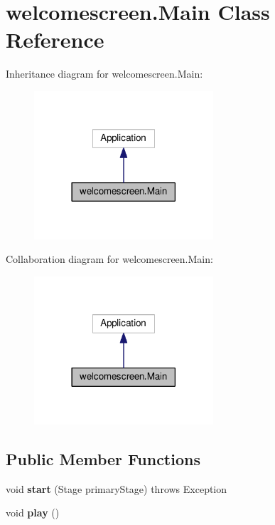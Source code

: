 \hypertarget{classwelcomescreen_1_1_main}{}\section{welcomescreen.\+Main Class Reference}
\label{classwelcomescreen_1_1_main}


Inheritance diagram for welcomescreen.\+Main\+:\nopagebreak
\begin{figure}[H]
\begin{center}
\leavevmode
\includegraphics[width=189pt]{classwelcomescreen_1_1_main__inherit__graph}
\end{center}
\end{figure}


Collaboration diagram for welcomescreen.\+Main\+:\nopagebreak
\begin{figure}[H]
\begin{center}
\leavevmode
\includegraphics[width=189pt]{classwelcomescreen_1_1_main__coll__graph}
\end{center}
\end{figure}
\subsection*{Public Member Functions}
\begin{DoxyCompactItemize}
\item 
void {\bfseries start} (Stage primary\+Stage)  throws Exception\hypertarget{classwelcomescreen_1_1_main_ab0026976cf6d9f524f7185905a3bf646}{}\label{classwelcomescreen_1_1_main_ab0026976cf6d9f524f7185905a3bf646}

\item 
void {\bfseries play} ()\hypertarget{classwelcomescreen_1_1_main_aedf3b8e99bf0506f7f27009f85d5988d}{}\label{classwelcomescreen_1_1_main_aedf3b8e99bf0506f7f27009f85d5988d}

\end{DoxyCompactItemize}
